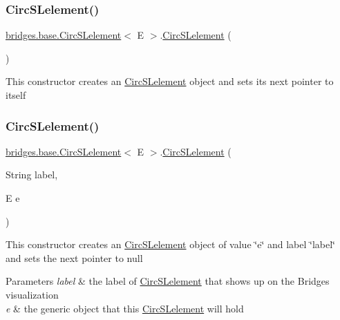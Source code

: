 \subsubsection{\texorpdfstring{Circ\+S\+Lelement()}{CircSLelement()}\hspace{0.1cm}{\footnotesize\ttfamily [1/4]}}
{\footnotesize\ttfamily \hyperlink{classbridges_1_1base_1_1_circ_s_lelement}{bridges.\+base.\+Circ\+S\+Lelement}$<$ E $>$.\hyperlink{classbridges_1_1base_1_1_circ_s_lelement}{Circ\+S\+Lelement} (\begin{DoxyParamCaption}{ }\end{DoxyParamCaption})}

This constructor creates an \hyperlink{classbridges_1_1base_1_1_circ_s_lelement}{Circ\+S\+Lelement} object and sets its next pointer to itself \mbox{\label{classbridges_1_1base_1_1_circ_s_lelement_a213d61713e51295d756669def911f080}} 
\subsubsection{\texorpdfstring{Circ\+S\+Lelement()}{CircSLelement()}\hspace{0.1cm}{\footnotesize\ttfamily [2/4]}}
{\footnotesize\ttfamily \hyperlink{classbridges_1_1base_1_1_circ_s_lelement}{bridges.\+base.\+Circ\+S\+Lelement}$<$ E $>$.\hyperlink{classbridges_1_1base_1_1_circ_s_lelement}{Circ\+S\+Lelement} (\begin{DoxyParamCaption}\item[{String}]{label,  }\item[{E}]{e }\end{DoxyParamCaption})}

This constructor creates an \hyperlink{classbridges_1_1base_1_1_circ_s_lelement}{Circ\+S\+Lelement} object of value \char`\"{}e\char`\"{} and label \char`\"{}label\char`\"{} and sets the next pointer to null


\begin{DoxyParams}{Parameters}
{\em label} & the label of \hyperlink{classbridges_1_1base_1_1_circ_s_lelement}{Circ\+S\+Lelement} that shows up on the Bridges visualization \\
\hline
{\em e} & the generic object that this \hyperlink{classbridges_1_1base_1_1_circ_s_lelement}{Circ\+S\+Lelement} will hold \\
\hline
\end{DoxyParams}
\mbox{\label{classbridges_1_1base_1_1_circ_s_lelement_ada65c593c8af7e6ed96fcdf12c26824f}} 
